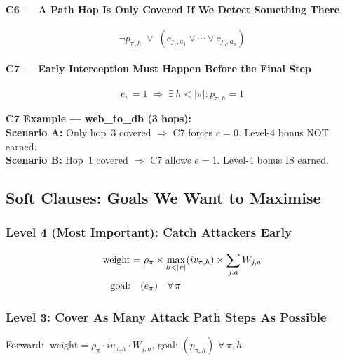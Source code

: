 \documentclass[journal]{IEEEtran}
\begin{document}
\paragraph{C6 --- A Path Hop Is Only Covered If We Detect
Something There}
\begin{equation}
  \neg p_{\pi,h} \;\vee\;
  (c_{j_1,a_1} \vee \cdots \vee c_{j_n,a_n})
\end{equation}

\paragraph{C7 --- Early Interception Must Happen Before the
Final Step}
\begin{equation}
  e_\pi = 1 \;\Longrightarrow\;
  \exists\, h < |\pi| : p_{\pi,h} = 1
\end{equation}

\begin{examplebox}
\textbf{C7 Example --- web\_to\_db (3 hops):}\\
\textbf{Scenario A:} Only hop~3 covered $\Rightarrow$
C7 forces $e=0$. Level-4 bonus NOT earned.\\
\textbf{Scenario B:} Hop~1 covered $\Rightarrow$
C7 allows $e=1$. Level-4 bonus IS earned.
\end{examplebox}

\subsection{Soft Clauses: Goals We Want to Maximise}

\subsubsection{Level 4 (Most Important): Catch Attackers Early}
\begin{align}
  \text{weight} &= \rho_\pi \times
    \max_{h < |\pi|}(iv_{\pi,h}) \times
    \sum_{j,a} W_{j,a} \notag \\
  \text{goal:} &\quad (e_\pi) \quad \forall\,\pi
\end{align}

\subsubsection{Level 3: Cover As Many Attack Path Steps
              As Possible}

Forward:
$\;\text{weight} = \rho_\pi \cdot iv_{\pi,h} \cdot W_{j,a}$,
\;goal: $(p_{\pi,h})$ $\forall\,\pi,h$.
\end{document}
